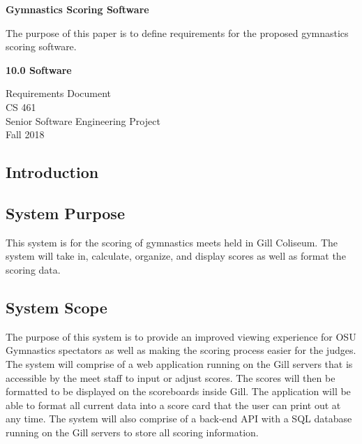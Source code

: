 \documentclass[letterpaper,10pt,draftclsnofoot,onecolumn,]{article}
\begin{document}
\noindent
\begin{titlepage}
    \begin{center}
        \vspace*{1cm}
        
        \textbf{Gymnastics Scoring Software}
        
        \vspace{0.5cm}
        The purpose of this paper is to define requirements for the proposed gymnastics scoring software.
        
        \vspace{1.5cm}
        
        \textbf{10.0 Software}
        
        Requirements Document\\
        CS 461\\
        Senior Software Engineering Project\\
        Fall 2018
        
    \end{center}
\end{titlepage}

\tableofcontents
\newpage

\begin{center}
\section{Introduction}
\end{center}

\subsection{System Purpose}
This system is for the scoring of gymnastics meets held in Gill Coliseum. The system will take in, calculate, organize, and display scores as well as format the scoring data.

\subsection{System Scope}
The purpose of this system is to provide an improved viewing experience for OSU Gymnastics spectators as well as making the scoring process easier for the judges. The system will comprise of a web application running on the Gill servers that is accessible by the meet staff to input or adjust scores. The scores will then be formatted to be displayed on the scoreboards inside Gill. The application will be able to format all current data into a score card that the user can print out at any time. The system will also comprise of a back-end API with a SQL database running on the Gill servers to store all scoring information.
\end{document}
